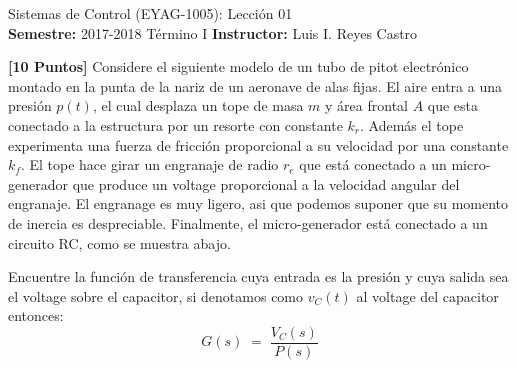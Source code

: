 \documentclass[ a4paper, twoside, 11pt]{article}
\newcommand{\numero}{01}
\begin{document}
\allowdisplaybreaks

\begin{center}
\Large Sistemas de Control (EYAG-1005): Lecci\'on \numero \\[1ex]
\small \textbf{Semestre:} 2017-2018 T\'ermino I \qquad
\textbf{Instructor:} Luis I. Reyes Castro
\end{center}
\halfskip



\begin{problem}
\textbf{[10 Puntos]} Considere el siguiente modelo de un tubo de pitot electr\'onico montado en la punta de la nariz de un aeronave de alas fijas. El aire entra a una presi\'on $p(t)$, el cual desplaza un tope de masa $m$ y \'area frontal $A$ que esta conectado a la estructura por un resorte con constante $k_r$. Adem\'as el tope experimenta una fuerza de fricci\'on proporcional a su velocidad por una constante $k_f$. El tope hace girar un engranaje de radio $r_e$ que est\'a conectado a un micro-generador que produce un voltage proporcional a la velocidad angular del engranaje. El engranage es muy ligero, asi que podemos suponer que su momento de inercia es despreciable. Finalmente, el micro-generador est\'a conectado a un circuito RC, como se muestra abajo. 

\begin{figure}[htb]
\centering
\def\svgwidth{0.8\columnwidth}

\end{figure}

Encuentre la funci\'on de transferencia cuya entrada es la presi\'on y cuya salida sea el voltage sobre el capacitor, \ie si denotamos como $v_C(t)$ al voltage del capacitor entonces: 
\[
G(s) \; = \; \frac{V_C(s)}{P(s)}
\]


\end{problem}
\end{document}
